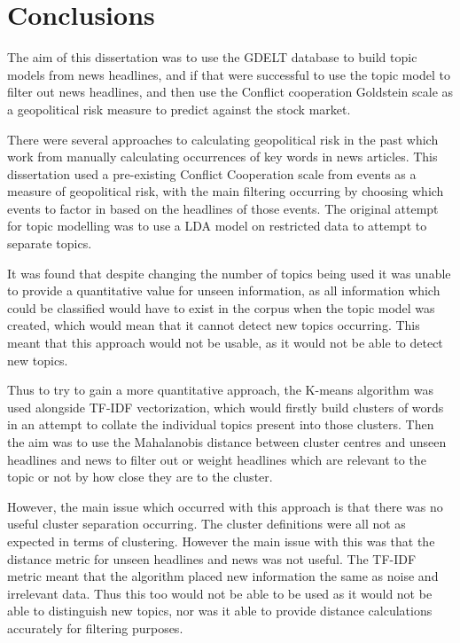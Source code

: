 \section{Conclusions}
The aim of this dissertation was to use the GDELT database to build topic models from news headlines, and if that were successful to use the topic model to filter out news headlines, and then use the Conflict cooperation Goldstein scale as a geopolitical risk measure to predict against the stock market. 

There were several approaches to calculating geopolitical risk in the past which work from manually calculating occurrences of key words in news articles. This dissertation used a pre-existing Conflict Cooperation scale from events as a measure of geopolitical risk, with the main filtering occurring by choosing which events to factor in based on the headlines of those events.  The original attempt for topic modelling was to use a LDA model on restricted data to attempt to separate topics.    

It was found that despite changing the number of topics being used it was unable to provide a quantitative value for unseen information, as all information which could be classified would have to exist in the corpus when the topic model was created, which would mean that it cannot detect new topics occurring. This meant that this approach would not be usable, as it would not be able to detect new topics.

Thus to try to gain a more quantitative approach, the K-means algorithm was used alongside TF-IDF vectorization, which would  firstly build clusters of words in an attempt to collate the individual topics present into those clusters. Then the aim was to use the Mahalanobis distance between cluster centres and unseen headlines and news to filter out or weight headlines which are relevant to the topic or not by how close they are to the cluster. 

However, the main issue which occurred with this approach is that there was no useful cluster separation occurring. The cluster definitions were all not as expected in terms of clustering. However the main issue with this was that the distance metric for unseen headlines and news was not useful. The TF-IDF metric meant that the algorithm placed new information the same as noise and irrelevant data. Thus this too would not be able to be used as it would not be able to distinguish new topics, nor was it able to provide distance calculations accurately for filtering purposes.

